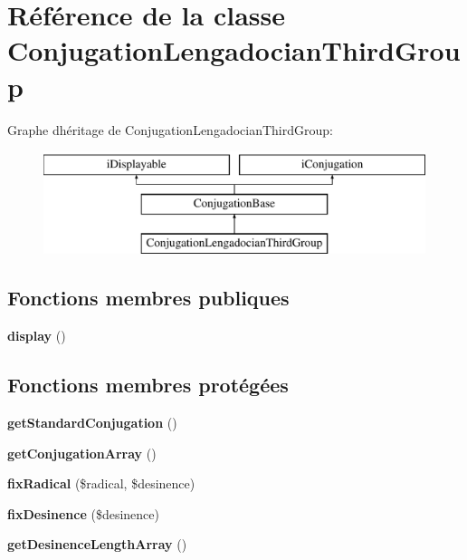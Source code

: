\hypertarget{classConjugationLengadocianThirdGroup}{}\section{Référence de la classe Conjugation\+Lengadocian\+Third\+Group}
\label{classConjugationLengadocianThirdGroup}
Graphe d\textquotesingle{}héritage de Conjugation\+Lengadocian\+Third\+Group\+:\begin{figure}[H]
\begin{center}
\leavevmode
\includegraphics[height=3.000000cm]{classConjugationLengadocianThirdGroup}
\end{center}
\end{figure}
\subsection*{Fonctions membres publiques}
\begin{DoxyCompactItemize}
\item 
\hypertarget{classConjugationLengadocianThirdGroup_a13c6997dad7cbe8c53fe4ecbad7367ab}{}\label{classConjugationLengadocianThirdGroup_a13c6997dad7cbe8c53fe4ecbad7367ab} 
{\bfseries display} ()
\end{DoxyCompactItemize}
\subsection*{Fonctions membres protégées}
\begin{DoxyCompactItemize}
\item 
\hypertarget{classConjugationLengadocianThirdGroup_a74123f02b8ac3ab7730bbc935acaefd5}{}\label{classConjugationLengadocianThirdGroup_a74123f02b8ac3ab7730bbc935acaefd5} 
{\bfseries get\+Standard\+Conjugation} ()
\item 
\hypertarget{classConjugationLengadocianThirdGroup_a11aedf41cff74c08a1bfd25ac5ce8709}{}\label{classConjugationLengadocianThirdGroup_a11aedf41cff74c08a1bfd25ac5ce8709} 
{\bfseries get\+Conjugation\+Array} ()
\item 
\hypertarget{classConjugationLengadocianThirdGroup_a24ef94ab2752b9ab2eadbefda6ddd959}{}\label{classConjugationLengadocianThirdGroup_a24ef94ab2752b9ab2eadbefda6ddd959} 
{\bfseries fix\+Radical} (\$radical, \$desinence)
\item 
\hypertarget{classConjugationLengadocianThirdGroup_a6c1f315bacb649a252e5058a28f46141}{}\label{classConjugationLengadocianThirdGroup_a6c1f315bacb649a252e5058a28f46141} 
{\bfseries fix\+Desinence} (\$desinence)
\item 
\hypertarget{classConjugationLengadocianThirdGroup_a728d85569c753bf2a42e963e51aeadfa}{}\label{classConjugationLengadocianThirdGroup_a728d85569c753bf2a42e963e51aeadfa} 
{\bfseries get\+Desinence\+Length\+Array} ()
\end{DoxyCompactItemize}
